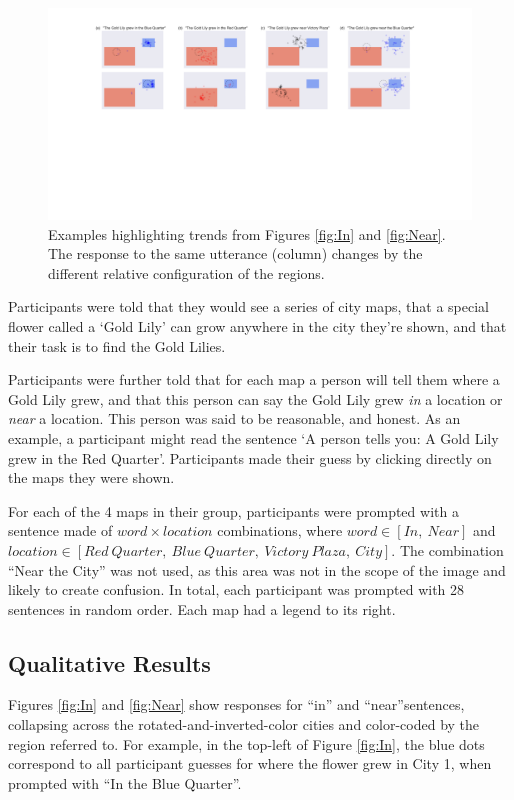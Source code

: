 \documentclass[10pt,letterpaper]{article}
\begin{document}
\begin{figure}[!t]
\center
\includegraphics[width=\textwidth]{figures/results1.pdf}
\caption{Examples highlighting trends from Figures \ref{fig:In} and \ref{fig:Near}. The response to the same utterance (column) changes by the different relative configuration of the regions.}
\label{fig:zoomIn}
\end{figure}

Participants were told that they would see a series of city maps, that a special flower called a `Gold Lily' can grow anywhere in the city they're shown, and that their task is to find the Gold Lilies. 

Participants were further told that for each map a person will tell them where a Gold Lily grew, and that this person can say the Gold Lily grew \textit{in} a location or \textit{near} a location. This person was said to be reasonable, and honest. As an example, a participant might read the sentence `A person tells you: A Gold Lily grew in the Red Quarter'. Participants made their guess by clicking directly on the maps they were shown.

For each of the 4 maps in their group, participants were prompted with a sentence made of $word \times location$ combinations, where $word \in [In,\ Near]$ and $location \in [Red\ Quarter,\ Blue\ Quarter,\ Victory\ Plaza,\ City]$. The combination ``Near the City'' was not used, as this area was not in the scope of the image and likely to create confusion. In total, each participant was prompted with 28 sentences in random order. Each map had a legend to its right. 

\subsection{Qualitative Results} 

Figures \ref{fig:In} and \ref{fig:Near} show responses for ``in'' and ``near''sentences, collapsing across the rotated-and-inverted-color cities and color-coded by the region referred to. For example, in the top-left of Figure \ref{fig:In}, the blue dots correspond to all participant guesses for where the flower grew in City 1, when prompted with ``In the Blue Quarter''. 
\end{document}
